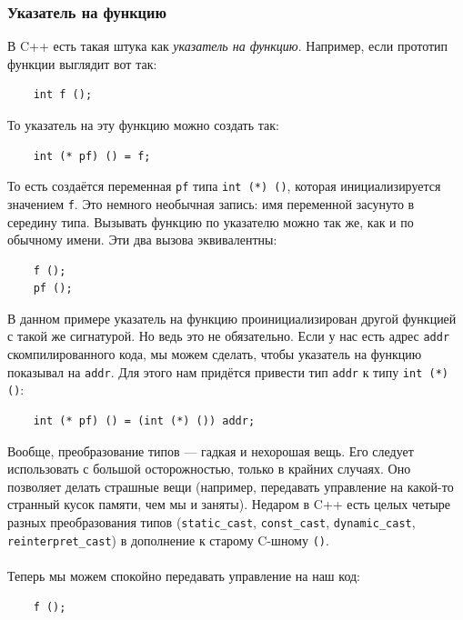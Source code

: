 \documentclass[11pt]{book}
\begin{document}
\subsubsection{Указатель на функцию}
В C++ есть такая штука как \emph{указатель на функцию}.
Например, если прототип функции выглядит вот так:
\begin{verbatim}
    int f ();
\end{verbatim}
То указатель на эту функцию можно создать так:
\begin{verbatim}
    int (* pf) () = f;
\end{verbatim}
То есть создаётся переменная \texttt{pf} типа \texttt{int (*) ()}, которая инициализируется значением \texttt{f}.
Это немного необычная запись: имя переменной засунуто в середину типа.
Вызывать функцию по указателю можно так же, как и по обычному имени.
Эти два вызова эквивалентны:
\begin{verbatim}
    f ();
    pf ();
\end{verbatim}
В данном примере указатель на функцию проинициализирован другой функцией с такой же сигнатурой.
Но ведь это не обязательно.
Если у нас есть адрес \texttt{addr} скомпилированного кода, мы можем сделать, чтобы указатель на функцию показывал на \texttt{addr}.
Для этого нам придётся привести тип \texttt{addr} к типу \texttt{int (*) ()}:
\begin{verbatim}
    int (* pf) () = (int (*) ()) addr;
\end{verbatim}
Вообще, преобразование типов --- гадкая и нехорошая вещь.
Его следует использовать с большой осторожностью, только в крайних случаях.
Оно позволяет делать страшные вещи (например, передавать управление на какой-то странный кусок памяти, чем мы и заняты).
Недаром в C++ есть целых четыре разных преобразования типов
(\texttt{static\_cast}, \texttt{const\_cast}, \texttt{dynamic\_cast}, \texttt{reinterpret\_cast})
в дополнение к старому C-шному \texttt{()}.
\\ \\
Теперь мы можем спокойно передавать управление на наш код:
\begin{verbatim}
    f ();
\end{verbatim}
\end{document}

